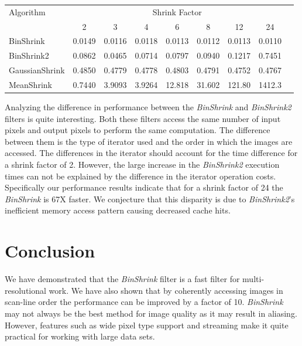 \documentclass{InsightArticle}
\begin{document}
\begin{table}
\begin{center}
\begin{tabular}{l|*{7}{c}r}
Algorithm & \multicolumn{7}{c}{Shrink Factor} \\
  &            2 & 3 & 4 & 6 & 8 & 12 & 24 \\
\hline
BinShrink &     0.0149 & 0.0116 & 0.0118 & 0.0113 & 0.0112 & 0.0113 & 0.0110\\
BinShrink2 &    0.0862 & 0.0465 & 0.0714 & 0.0797 & 0.0940 & 0.1217 & 0.7451\\
GaussianShrink &0.4850 & 0.4779 & 0.4778 & 0.4803 & 0.4791 & 0.4752 & 0.4767\\
MeanShrink &    0.7440 & 3.9093 & 3.9264 & 12.818 & 31.602 & 121.80 & 1412.3\\
\end{tabular}
\label{tab:ShrinkPerformance}
\end{center}
\end{table}

Analyzing the difference in performance between the \textit{BinShrink}
and \textit{BinShrink2} filters is quite interesting. Both these
filters access the same number of input pixels and output pixels to
perform the same computation. The difference between them is the type of iterator
used and the order in which the images are accessed. The differences
in the iterator should account for the time difference
for a shrink factor of 2. However, the large increase in the
\textit{BinShrink2} execution times can not be explained by the
difference in the iterator operation costs. Specifically our
performance results indicate that for a shrink factor of 24 the
\textit{BinShrink} is 67X faster. We conjecture that this disparity is
due to \textit{BinShrink2}'s inefficient memory access pattern
causing decreased cache hits.

\section{Conclusion}

We have demonstrated that the \textit{BinShrink} filter is a fast
filter for multi-resolutional work. We have also shown that
by coherently accessing images in scan-line order the performance can
be improved by a factor of 10.
\textit{BinShrink} may not always be the best method for image quality as it
may result in aliasing. However, features such as wide pixel type
support and streaming make it quite practical for working with large
data sets.




\end{document}
